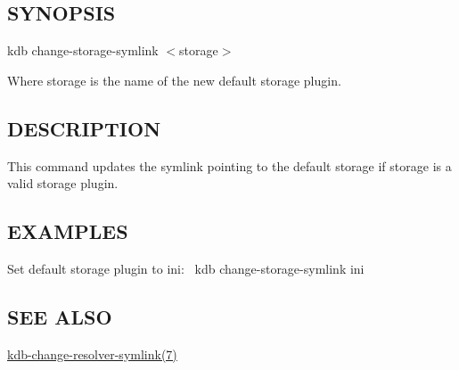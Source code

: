 \subsection*{S\+Y\+N\+O\+P\+S\+IS}

{\ttfamily kdb change-\/storage-\/symlink $<$storage$>$}

Where {\ttfamily storage} is the name of the new default storage plugin.

\subsection*{D\+E\+S\+C\+R\+I\+P\+T\+I\+ON}

This command updates the symlink pointing to the default storage if {\ttfamily storage} is a valid storage plugin.

\subsection*{E\+X\+A\+M\+P\+L\+ES}

Set default storage plugin to ini\+:~\newline
 {\ttfamily kdb change-\/storage-\/symlink ini}

\subsection*{S\+EE A\+L\+SO}


\begin{DoxyItemize}
\item \hyperlink{doc_help_kdb-change-resolver-symlink_md}{kdb-\/change-\/resolver-\/symlink(7)} 
\end{DoxyItemize}